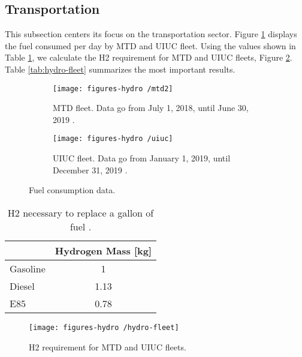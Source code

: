 \documentclass[11pt,letterpaper]{article}
\begin{document}
\subsection{Transportation}

This subsection centers its focus on the transportation sector.
Figure \ref{fig:fuel} displays the fuel consumed per day by \gls{MTD} and \gls{UIUC} fleet.
Using the values shown in Table \ref{tab:equiv}, we calculate the \gls{H2} requirement for MTD and UIUC fleets, Figure \ref{fig:hydro-fleet}.
Table \ref{tab:hydro-fleet} summarizes the most important results.

	\begin{figure}[htbp!]
		\centering
		\begin{subfigure}[t]{0.4\textwidth}
			\centering
			\texttt{[image: figures-hydro /mtd2]}
			\caption{\gls{MTD} fleet. Data go from July 1, 2018, until June 30, 2019 \cite{mtd_irecords_2019}.}
		\end{subfigure}
		\begin{subfigure}[t]{0.4\textwidth}
			\centering
			\texttt{[image: figures-hydro /uiuc]}
			\caption{\gls{UIUC} fleet. Data go from January 1, 2019, until December 31, 2019 \cite{uiuc_personnal_communication}.}
		\end{subfigure}
		\hfill
		\caption{Fuel consumption data.}
		\label{fig:fuel}
	\end{figure}

	\begin{table}[htbp!]
	\centering
	\caption{\gls{H2} necessary to replace a gallon of fuel \cite{doe_office_of_energy_efficiency_and_renewable_energy_hydrogen_2020} \cite{alternative_fuels_data_center_fuel_2014}.}
	\begin{tabular}{l|c}
	    \hline
	 	                 & Hydrogen Mass [kg] \\ \hline
	 	Gasoline         & 1                  \\
	 	Diesel           & 1.13               \\
	 	E85              & 0.78               \\ \hline
	\end{tabular}
	\label{tab:equiv}
	\end{table}

	\begin{figure}[htbp!]
	    \centering
		\texttt{[image: figures-hydro /hydro-fleet]}
		\hfill
		\caption{\gls{H2} requirement for MTD and UIUC fleets.}
		\label{fig:hydro-fleet}
	\end{figure}
\end{document}
